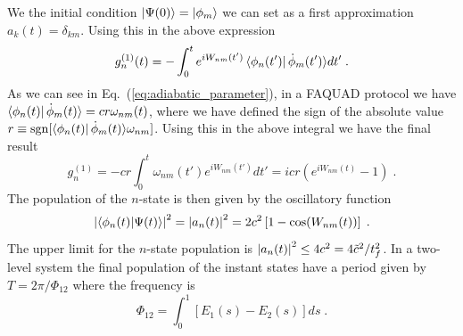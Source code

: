 \documentclass[a4paper,11pt]{article}
\begin{document}
We the initial condition $\ket{\Psi(0)}=\ket{\phi_m}$ we can set as a first approximation $a_k(t)=\delta_{km}$. Using this in the above expression
\begin{equation}
	g_n^{(1)}(t)=-\int_0^te^{iW_{nm}(t')}\bra{\phi_n(t')}\dot{\phi}_m(t')\rangle dt'\; .
\end{equation}
As we can see in Eq.~(\ref{eq:adiabatic_parameter}), in a FAQUAD protocol we have $\bra{\phi_n(t)}\dot{\phi}_m(t)\rangle=cr\omega_{nm}(t)$, where we have defined the sign of the absolute value $r\equiv \operatorname{sgn}[\bra{\phi_n(t)}\dot{\phi}_m(t)\rangle\omega_{nm}]$. Using this in the above integral we have the final result
\begin{equation}
	g_n^{(1)}=-cr\int_0^t\omega_{nm}(t')e^{iW_{nm}(t')}dt'=icr\left(e^{iW_{nm}(t)}-1\right)\; .
\end{equation}
The population of the $n$-state is then given by the oscillatory function
\begin{equation}
	\abs{\braket{\phi_n(t)}{\Psi(t)}}^2=\abs{a_n(t)}^2=2c^2\left[1-\cos(W_{nm}(t))\right]\; .
	\label{eq:amplitude_undesired_states}
\end{equation}
The upper limit for the $n$-state population is $\abs{a_n(t)}^2\leq4c^2=4\tilde{c}^2/t_f^2$. In a two-level system the final population of the instant states have a period given by $T=2\pi/\Phi_{12}$ where the frequency is
\begin{equation}
	\Phi_{12}=\int_0 ^1 [E_1(s)-E_2(s)]ds\; .
\end{equation}
\end{document}
